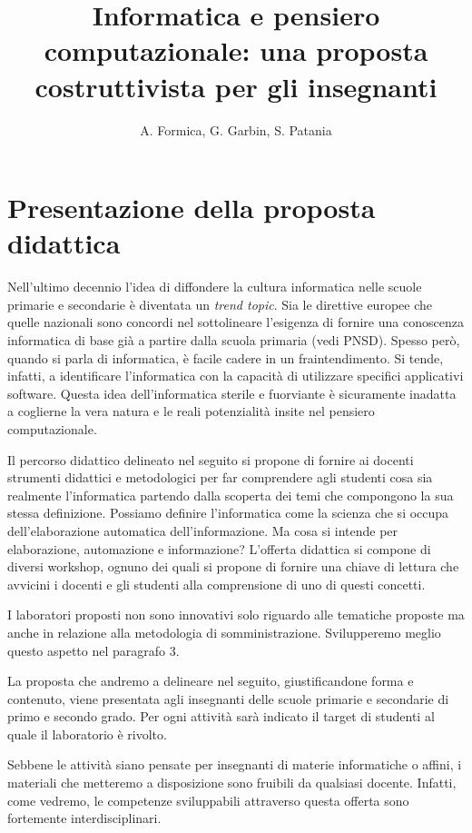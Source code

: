 \documentclass[12pt]{article}
\title{Informatica e pensiero computazionale: una proposta costruttivista per gli insegnanti}
\author{A. Formica, G. Garbin, S. Patania}
\begin{document}
\maketitle
%
% 
\section{Presentazione della proposta didattica}
Nell’ultimo decennio l’idea di diffondere la cultura informatica nelle scuole primarie e secondarie è diventata un \emph{trend topic}. Sia le direttive europee che quelle nazionali sono concordi nel sottolineare l’esigenza di fornire una conoscenza informatica di base già a partire dalla scuola primaria (vedi PNSD). Spesso però, quando si parla di informatica, è facile cadere in un fraintendimento. Si tende, infatti, a identificare l’informatica con la capacità di utilizzare specifici applicativi software. Questa idea dell’informatica sterile e fuorviante è sicuramente inadatta a coglierne la vera natura e le reali potenzialità insite nel pensiero computazionale.

Il percorso didattico delineato nel seguito si propone di fornire ai docenti strumenti didattici e metodologici per far comprendere agli studenti cosa sia realmente l’informatica partendo dalla scoperta dei temi che compongono la sua stessa definizione. Possiamo definire l’informatica come la scienza che si occupa dell’elaborazione automatica dell’informazione. Ma cosa si intende per elaborazione, automazione e informazione? L’offerta didattica si compone di diversi workshop, ognuno dei quali si propone di fornire una chiave di lettura che avvicini i docenti e gli studenti alla comprensione di uno di questi concetti.

I laboratori proposti non sono innovativi solo riguardo alle tematiche proposte ma anche in relazione alla metodologia di somministrazione. %
Svilupperemo meglio questo aspetto nel paragrafo 3.
 
La proposta che andremo a delineare nel seguito, giustificandone forma e contenuto, viene presentata agli insegnanti delle scuole primarie e secondarie di primo e secondo grado. Per ogni attività sarà indicato il target di studenti al quale il laboratorio è rivolto.

Sebbene le attività siano pensate per insegnanti di materie informatiche o affini, i materiali che metteremo a disposizione sono fruibili da qualsiasi docente. Infatti, come vedremo, le competenze sviluppabili attraverso questa offerta sono fortemente interdisciplinari.
%
%
\end{document}
